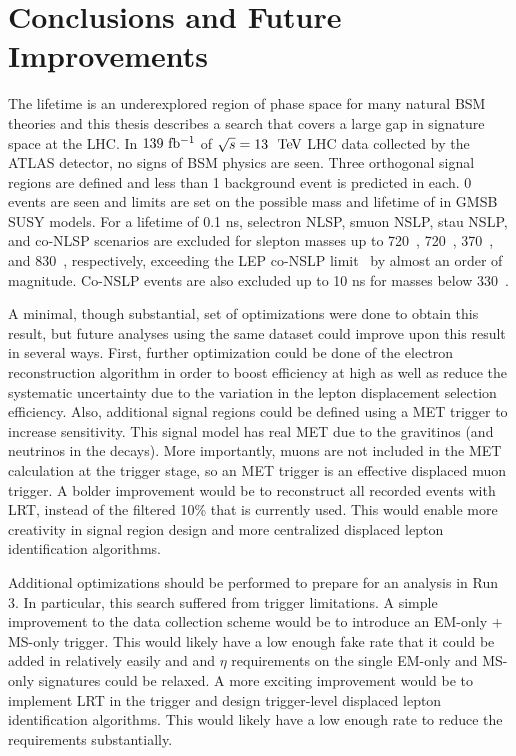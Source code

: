 \chapter{Conclusions and Future Improvements}
\label{chap:conclusions}

The lifetime is an underexplored region of phase space for many natural \ac{BSM} theories and this thesis describes a search that covers a large gap in signature space at the \ac{LHC}. In $139~ \mbox{fb\(^{-1}\)}$ of $\sqrt{s} = 13~\TeV$ \ac{LHC} data collected by the \ac{ATLAS} detector, no signs of \ac{BSM} physics are seen. Three orthogonal signal regions are defined and less than 1 background event is predicted in each. 0 events are seen and limits are set on the possible mass and lifetime of \slep in \ac{GMSB} \ac{SUSY} models. For a lifetime of 0.1 ns, selectron NLSP, smuon NSLP, stau NSLP, and co-NLSP scenarios are excluded for slepton masses up to 720~\GeV, 720~\GeV, 370~\GeV, and 830~\GeV, respectively, exceeding the LEP co-NSLP limit~\cite{LEP-comb} by almost an order of magnitude. Co-NSLP events are also excluded up to 10 ns for masses below 330~\GeV.

A minimal, though substantial, set of optimizations were done to obtain this result, but future analyses using the same dataset could improve upon this result in several ways. First, further optimization could be done of the electron reconstruction algorithm in order to boost efficiency at high \absdz as well as reduce the systematic uncertainty due to the variation in the lepton displacement selection efficiency. Also, additional signal regions could be defined using a \ac{MET} trigger to increase sensitivity. This signal model has real \ac{MET} due to the gravitinos (and neutrinos in the \stau decays). More importantly, muons are not included in the \ac{MET} calculation at the trigger stage, so an \ac{MET} trigger is an effective displaced muon trigger. A bolder improvement would be to reconstruct all recorded events with \ac{LRT}, instead of the filtered 10\% that is currently used. This would enable more creativity in signal region design and more centralized displaced lepton identification algorithms. 

Additional optimizations should be performed to prepare for an analysis in Run 3. In particular, this search suffered from trigger limitations. A simple improvement to the data collection scheme would be to introduce an EM-only + MS-only trigger. This would likely have a low enough fake rate that it could be added in relatively easily and \pt and $\eta$ requirements on the single EM-only and MS-only signatures could be relaxed. A more exciting improvement would be to implement \ac{LRT} in the trigger and design trigger-level displaced lepton identification algorithms. This would likely have a low enough rate to reduce the \pt requirements substantially. 

